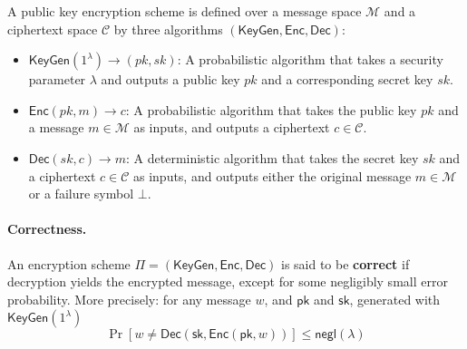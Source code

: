 

\begin{definition}
A public key encryption scheme is defined over a message space $\mathcal{M}$ and a ciphertext space $\mathcal{C}$ by three algorithms $(\mathsf{KeyGen}, \mathsf{Enc}, \mathsf{Dec})$:
\begin{itemize}
    \item $\mathsf{KeyGen}(1^\lambda) \to (pk, sk)$: A probabilistic algorithm that takes a security parameter $\lambda$ and outputs a public key $pk$ and a corresponding secret key $sk$.
    \item $\mathsf{Enc}(pk, m) \to c$: A probabilistic algorithm that takes the public key $pk$ and a message $m \in \mathcal{M}$ as inputs, and outputs a ciphertext $c \in \mathcal{C}$.
    \item $\mathsf{Dec}(sk, c) \to m$: A deterministic algorithm that takes the secret key $sk$ and a ciphertext $c \in \mathcal{C}$ as inputs, and outputs either the original message $m \in \mathcal{M}$ or a failure symbol $\bot$.
\end{itemize}
\end{definition}

\paragraph{Correctness.} An encryption scheme $\Pi = (\mathsf{KeyGen}, \mathsf{Enc}, \mathsf{Dec})$ is said to be \textbf{correct} if decryption yields the encrypted message, except for some negligibly small error probability. More precisely: for any message $w$, and $\mathsf{pk}$ and $\mathsf{sk}$, generated with $\mathsf{KeyGen}(1^\lambda)$
\[
\Pr \left[ w \neq \mathsf{Dec}(\mathsf{sk}, \mathsf{Enc}(\mathsf{pk}, w)) \right] \le \mathsf{negl}(\lambda)
\]



